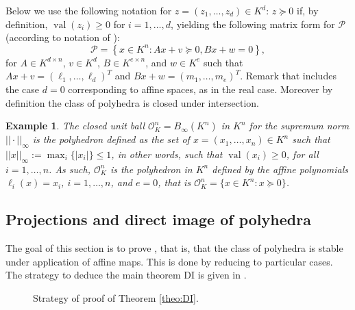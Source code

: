 \documentclass[sigconf]{acmart}
\newcommand{\PP}{\mathcal{P}}
\newtheorem{example}[theorem]{Example}
\DeclareMathOperator{\val}{val}
\newcommand{\OK}{\mathcal{O}_K}
\begin{document}
Below we use the following notation for $z = (z_1,\ldots,z_d) \in K^d$:
$z \succeq 0$ if, by definition, $\val(z_i)\geq 0$ for $i=1,\ldots,d$,
yielding the following matrix form for $\PP$ (according to notation of
):
\begin{equation}\label{eq_def_polyhedra_compact}
  \PP = \left\lbrace x \in K^n : Ax+v \succeq 0, Bx+w = 0 \right\rbrace,
\end{equation}
for $A \in K^{d \times n}$, $v \in K^d$, $B \in K^{e \times n}$, and
$w \in K^e$ such that $Ax+v = (\ell_1,\ldots,\ell_d)^T$
and $Bx+w = (m_1,\ldots,m_e)^T$.
Remark that  includes the case $d=0$ corresponding to affine spaces, as in the real case.
Moreover by definition the class of polyhedra is closed under intersection.

\begin{example}
  The {closed unit ball} $\OK^n=B_\infty(K^n)$ in $K^n$ for the supremum norm $||\cdot||_{\infty}$ is the
  polyhedron defined as the set of $x=(x_1,\ldots,x_n) \in K^n$ such that $||x||_{\infty} :=
  \max_i\{\vert x_i \vert\} \leq 1$, in other words, such that $\val(x_i) \geq 0$, for all $i=1, \ldots, n$.
  As such, $\OK^n$ is the polyhedron in $K^n$ defined by the affine polynomials
  $\ell_i(x)=x_i$, $i=1,\ldots, n$, and $e=0$, that is $\OK^n = \{x \in K^n : x \succeq 0\}$.
\end{example}

\subsection{Projections and direct image of polyhedra}
\label{ssec:projections}
The goal of this section is to prove , that is, that
the class of polyhedra is stable under application of affine maps. This is done
by reducing to particular cases. The strategy to deduce the main theorem DI 
is given in .

\begin{figure}[!ht] 
\centering
{}
\caption{Strategy of proof of Theorem \ref{theo:DI}.}
\label{fig:di-properties}
\end{figure}
\end{document}
